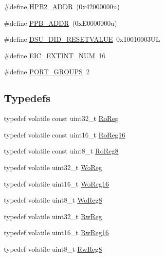 \begin{DoxyCompactItemize}
\item 
\#define \mbox{\hyperlink{group___s_a_m_d21_j15_a__definitions_gaef42fa53ddf169a2a50be70d29f73571}{H\+P\+B2\+\_\+\+A\+D\+DR}}~(0x42000000u)
\item 
\#define \mbox{\hyperlink{group___s_a_m_d21_j15_a__definitions_ga8895d0a3a9a3126cc44330f86c8ce564}{P\+P\+B\+\_\+\+A\+D\+DR}}~(0x\+E0000000u)
\item 
\#define \mbox{\hyperlink{group___s_a_m_d21_j15_a__definitions_gada75131d542c9e1966238f5488f89bd6}{D\+S\+U\+\_\+\+D\+I\+D\+\_\+\+R\+E\+S\+E\+T\+V\+A\+L\+UE}}~0x10010003\+UL
\item 
\#define \mbox{\hyperlink{group___s_a_m_d21_j15_a__definitions_ga88ebc38c95506296f5d21f82476296ae}{E\+I\+C\+\_\+\+E\+X\+T\+I\+N\+T\+\_\+\+N\+UM}}~16
\item 
\#define \mbox{\hyperlink{group___s_a_m_d21_j15_a__definitions_gab9243ffe03a1dc631b57a495b4b3d467}{P\+O\+R\+T\+\_\+\+G\+R\+O\+U\+PS}}~2
\end{DoxyCompactItemize}
\subsection*{Typedefs}
\begin{DoxyCompactItemize}
\item 
typedef volatile const uint32\+\_\+t \mbox{\hyperlink{group___s_a_m_d21_j15_a__definitions_ga5d556f8391af4141be23f7334ac9dd68}{Ro\+Reg}}
\item 
typedef volatile const uint16\+\_\+t \mbox{\hyperlink{group___s_a_m_d21_j15_a__definitions_gaebf6e33c2d49a802e06e22a95ea9d0d0}{Ro\+Reg16}}
\item 
typedef volatile const uint8\+\_\+t \mbox{\hyperlink{group___s_a_m_d21_j15_a__definitions_ga0d957f1433aaf5d70e4dc2b68288442d}{Ro\+Reg8}}
\item 
typedef volatile uint32\+\_\+t \mbox{\hyperlink{group___s_a_m_d21_j15_a__definitions_gac0f96d4e8018367b38f527007cf0eafd}{Wo\+Reg}}
\item 
typedef volatile uint16\+\_\+t \mbox{\hyperlink{group___s_a_m_d21_j15_a__definitions_ga0ab0e5f6c8301aa1c2068e511d854094}{Wo\+Reg16}}
\item 
typedef volatile uint8\+\_\+t \mbox{\hyperlink{group___s_a_m_d21_j15_a__definitions_ga5e336e5a36ee12ebeafb021108e5275b}{Wo\+Reg8}}
\item 
typedef volatile uint32\+\_\+t \mbox{\hyperlink{group___s_a_m_d21_j15_a__definitions_gacf1496e3bbe303e55f627fc7558a68c7}{Rw\+Reg}}
\item 
typedef volatile uint16\+\_\+t \mbox{\hyperlink{group___s_a_m_d21_j15_a__definitions_gacce07556c80fc352ae607f225f19fed5}{Rw\+Reg16}}
\item 
typedef volatile uint8\+\_\+t \mbox{\hyperlink{group___s_a_m_d21_j15_a__definitions_gae361754be775bb192f85821d3ab33c17}{Rw\+Reg8}}
\end{DoxyCompactItemize}


